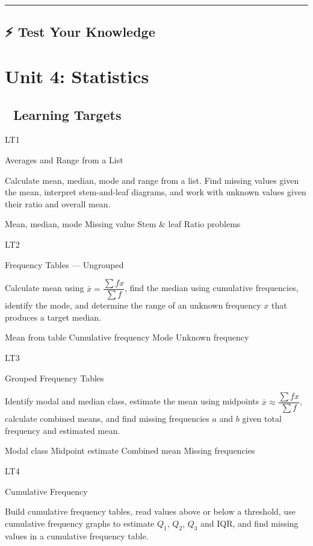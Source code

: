 \documentclass[
  letterpaper,
  DIV=11,
  numbers=noendperiod]{scrreprt}
\theoremstyle{definition}
\theoremstyle{remark}
\begin{document}
\begin{center}\rule{0.5\linewidth}{0.5pt}\end{center}

\section{⚡ Test Your Knowledge}\label{sec-mensuration-worksheet}

\chapter{Unit 4: Statistics}\label{unit-4-statistics}

\section{🎯 Learning Targets}\label{learning-targets-3}

LT1

Averages and Range from a List

Calculate mean, median, mode and range from a list. Find missing values
given the mean, interpret stem-and-leaf diagrams, and work with unknown
values given their ratio and overall mean.

{Mean, median, mode} {Missing value} {Stem \& leaf} {Ratio problems}

LT2

Frequency Tables --- Ungrouped

Calculate mean using \(\bar{x} = \dfrac{\sum fx}{\sum f}\), find the
median using cumulative frequencies, identify the mode, and determine
the range of an unknown frequency \(x\) that produces a target median.

{Mean from table} {Cumulative frequency} {Mode} {Unknown frequency}

LT3

Grouped Frequency Tables

Identify modal and median class, estimate the mean using midpoints
\(\bar{x} \approx \dfrac{\sum fx}{\sum f}\), calculate combined means,
and find missing frequencies \(a\) and \(b\) given total frequency and
estimated mean.

{Modal class} {Midpoint estimate} {Combined mean} {Missing frequencies}

LT4

Cumulative Frequency

Build cumulative frequency tables, read values above or below a
threshold, use cumulative frequency graphs to estimate \(Q_1\), \(Q_2\),
\(Q_3\) and IQR, and find missing values in a cumulative frequency
table.
\end{document}
